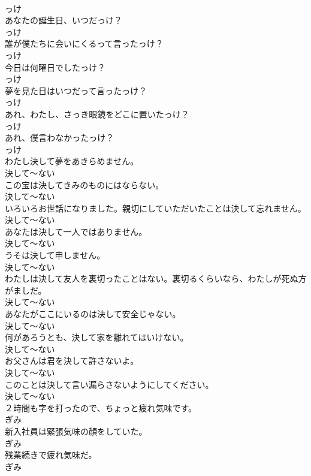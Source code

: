 \documentclass[8pt]{extreport}
\begin{document}
\begin{CJK}{UTF8}{min}
\\	っけ
\\	あなたの誕生日、いつだっけ？	
\\	っけ
\\	誰が僕たちに会いにくるって言ったっけ？	
\\	っけ
\\	今日は何曜日でしたっけ？	
\\	っけ
\\	夢を見た日はいつだって言ったっけ？	
\\	っけ
\\	あれ、わたし、さっき眼鏡をどこに置いたっけ？	
\\	っけ
\\	あれ、僕言わなかったっけ？	
\\	っけ
\\	わたし決して夢をあきらめません。	
\\	決して～ない
\\	この宝は決してきみのものにはならない。	
\\	決して～ない
\\	いろいろお世話になりました。親切にしていただいたことは決して忘れません。	
\\	決して～ない
\\	あなたは決して一人ではありません。	
\\	決して～ない
\\	うそは決して申しません。	
\\	決して～ない
\\	わたしは決して友人を裏切ったことはない。裏切るくらいなら、わたしが死ぬ方がましだ。	
\\	決して～ない
\\	あなたがここにいるのは決して安全じゃない。	
\\	決して～ない
\\	何があろうとも、決して家を離れてはいけない。	
\\	決して～ない
\\	お父さんは君を決して許さないよ。	
\\	決して～ない
\\	このことは決して言い漏らさないようにしてください。	
\\	決して～ない
\\	２時間も字を打ったので、ちょっと疲れ気味です。	
\\	ぎみ
\\	新入社員は緊張気味の顔をしていた。	
\\	ぎみ
\\	残業続きで疲れ気味だ。	
\\	ぎみ

\end{CJK}
\end{document}
